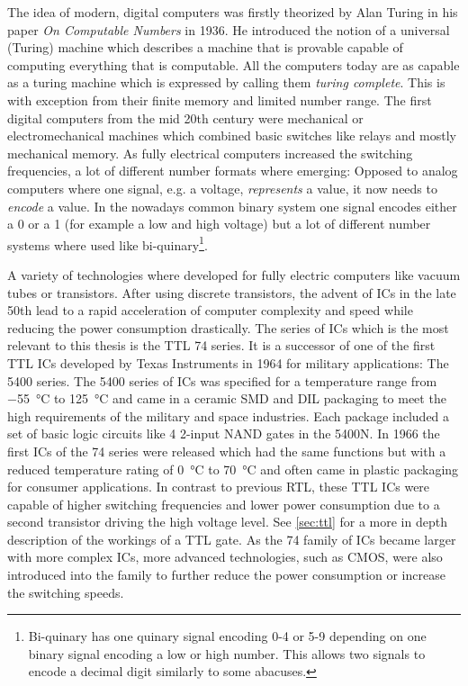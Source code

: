 The idea of modern, digital computers was firstly theorized by Alan Turing in his paper \emph{On Computable Numbers} in 1936. \cite{10.1112/plms/s2-42.1.230}
He introduced the notion of a universal (Turing) machine which describes a machine that is provable capable of computing everything that is computable.
All the computers today are as capable as a turing machine which is expressed by calling them \emph{turing complete}.
This is with exception from their finite memory and limited number range.
The first digital computers from the mid 20th century were mechanical or electromechanical machines which combined basic switches like relays and mostly mechanical memory.
As fully electrical computers increased the switching frequencies, a lot of different number formats where emerging:
Opposed to analog computers where one signal, e.g. a voltage, \emph{represents} a value, it now needs to \emph{encode} a value.
In the nowadays common binary system one signal encodes either a 0 or a 1 (for example a low and high voltage) but a lot of different number systems where used like bi-quinary\footnote{Bi-quinary has one quinary signal encoding 0-4 or 5-9 depending on one binary signal encoding a low or high number. This allows two signals to encode a decimal digit similarly to some abacuses.}.

A variety of technologies where developed for fully electric computers like vacuum tubes or transistors.
After using discrete transistors, the advent of \glspl{IC} in the late 50th lead to a rapid acceleration of computer complexity and speed while reducing the power consumption drastically.
The series of \glspl{IC} which is the most relevant to this thesis is the \gls{TTL} 74 series.
It is a successor of one of the first \gls{TTL} \glspl{IC} developed by Texas Instruments in 1964 for military applications: The 5400 series. \cite{ICs}
The 5400 series of \glspl{IC} was specified for a temperature range from \qty{-55}{\celsius} to \qty{+125}{\celsius} and came in a ceramic \gls{SMD} and \gls{DIL} packaging to meet the high requirements of the military and space industries.
Each package included a set of basic logic circuits like 4 2-input NAND gates in the 5400N.
In 1966 the first \glspl{IC} of the 74 series were released which had the same functions but with a reduced temperature rating of \qty{0}{\celsius} to \qty{+70}{\celsius} and often came in plastic packaging for consumer applications.
In contrast to previous \gls{RTL}, these \gls{TTL} \glspl{IC} were capable of higher switching frequencies and lower power consumption due to a second transistor driving the high voltage level.
See \cref{sec:ttl} for a more in depth description of the workings of a \gls{TTL} gate.
As the 74 family of \glspl{IC} became larger with more complex \glspl{IC}, more advanced technologies, such as \gls{CMOS}, were also introduced into the family to further reduce the power consumption or increase the switching speeds.

